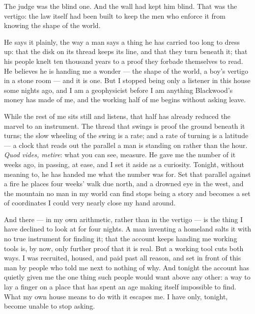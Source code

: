 The judge was the blind one. And the wall had kept him blind. That was the vertigo: the law itself had been built to keep the men who enforce it from knowing the shape of the world.\par
 
\ornament
 
He says it plainly, the way a man says a thing he has carried too long to dress up: that the disk on its thread keeps its line, and that they turn beneath it; that his people knelt ten thousand years to a proof they forbade themselves to read. He believes he is handing me a wonder --- the shape of the world, a boy's vertigo in a stone room --- and it is one. But I stopped being only a listener in this house some nights ago, and I am a geophysicist before I am anything Blackwood's money has made of me, and the working half of me begins without asking leave.\par
 
While the rest of me sits still and listens, that half has already reduced the marvel to an instrument. The thread that swings is proof the ground beneath it turns; the slow wheeling of the swing is a rate; and a rate of turning is a latitude --- a clock that reads out the parallel a man is standing on rather than the hour. \textit{Quod vides, metire}: what you can see, measure. He gave me the number of it weeks ago, in passing, at ease, and I set it aside as a curiosity. Tonight, without meaning to, he has handed me what the number was for. Set that parallel against a fire he places four weeks' walk due north, and a drowned eye in the west, and the mountain no man in my world can find stops being a story and becomes a set of coordinates I could very nearly close my hand around.\par
 
And there --- in my own arithmetic, rather than in the vertigo --- is the thing I have declined to look at for four nights. A man inventing a homeland salts it with no true instrument for finding it; that the account keeps handing me working tools is, by now, only further proof that it is real. But a working tool cuts both ways. I was recruited, housed, and paid past all reason, and set in front of this man by people who told me next to nothing of why. And tonight the account has quietly given me the one thing such people would want above any other: a way to lay a finger on a place that has spent an age making itself impossible to find. What my own house means to do with it escapes me. I have only, tonight, become unable to stop asking.\par
 

